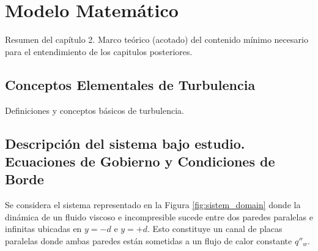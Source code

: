 \chapter{Modelo Matemático}

Resumen del capítulo 2. Marco teórico (acotado) del contenido mínimo necesario para el entendimiento de los
capitulos posteriores.

\newpage

\section{Conceptos Elementales de Turbulencia}
Definiciones y conceptos básicos de turbulencia.


\section{Descripción del sistema bajo estudio. Ecuaciones de Gobierno y Condiciones de Borde}

Se considera el sistema representado en la Figura \ref{fig:sistem_domain} donde la dinámica de un fluido viscoso e incompresible sucede entre dos paredes paralelas e infinitas ubicadas en $y=-d$ e $y=+d$. Esto constituye un canal de placas paralelas donde ambas paredes están sometidas a un flujo de calor constante $q''_w$.


